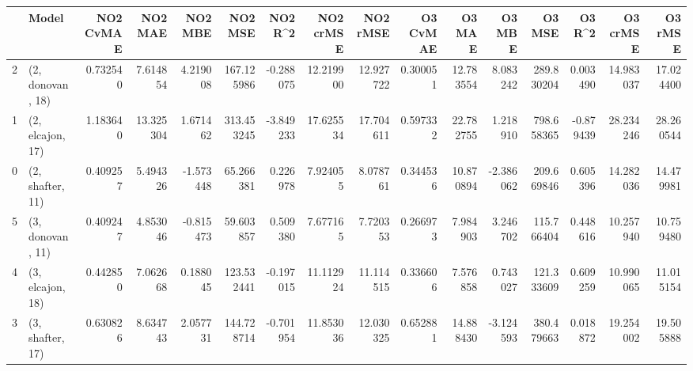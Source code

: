 \begin{tabular}{llrrrrrrrrrrrrrr}
\toprule
{} &             Model &  NO2 CvMAE &    NO2 MAE &   NO2 MBE &     NO2 MSE &   NO2 R\textasciicircum2 &  NO2 crMSE &   NO2 rMSE &  O3 CvMAE &     O3 MAE &    O3 MBE &      O3 MSE &    O3 R\textasciicircum2 &   O3 crMSE &    O3 rMSE \\
\midrule
2 &  (2, donovan, 18) &   0.732540 &   7.614854 &  4.219008 &  167.125986 & -0.288075 &  12.219900 &  12.927722 &  0.300051 &  12.783554 &  8.083242 &  289.830204 &  0.003490 &  14.983037 &  17.024400 \\
1 &  (2, elcajon, 17) &   1.183640 &  13.325304 &  1.671462 &  313.453245 & -3.849233 &  17.625534 &  17.704611 &  0.597332 &  22.782755 &  1.218910 &  798.658365 & -0.879439 &  28.234246 &  28.260544 \\
0 &  (2, shafter, 11) &   0.409257 &   5.494326 & -1.573448 &   65.266381 &  0.226978 &   7.924055 &   8.078761 &  0.344536 &  10.870894 & -2.386062 &  209.669846 &  0.605396 &  14.282036 &  14.479981 \\
5 &  (3, donovan, 11) &   0.409247 &   4.853046 & -0.815473 &   59.603857 &  0.509380 &   7.677165 &   7.720353 &  0.266973 &   7.984903 &  3.246702 &  115.766404 &  0.448616 &  10.257940 &  10.759480 \\
4 &  (3, elcajon, 18) &   0.442850 &   7.062668 &  0.188045 &  123.532441 & -0.197015 &  11.112924 &  11.114515 &  0.336606 &   7.576858 &  0.743027 &  121.333609 &  0.609259 &  10.990065 &  11.015154 \\
3 &  (3, shafter, 17) &   0.630826 &   8.634743 &  2.057731 &  144.728714 & -0.701954 &  11.853036 &  12.030325 &  0.652881 &  14.888430 & -3.124593 &  380.479663 &  0.018872 &  19.254002 &  19.505888 \\
\bottomrule
\end{tabular}
